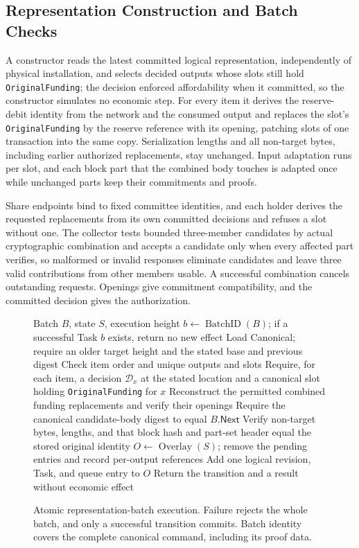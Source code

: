 \subsection{Representation Construction and Batch Checks}
A constructor reads the latest committed logical representation, independently of physical installation, and selects decided outputs whose slots still hold \texttt{OriginalFunding}; the decision enforced affordability when it committed, so the constructor simulates no economic step. For every item it derives the reserve-debit identity from the network and the consumed output and replaces the slot's \texttt{OriginalFunding} by the reserve reference with its opening, patching slots of one transaction into the same copy. Serialization lengths and all non-target bytes, including earlier authorized replacements, stay unchanged. Input adaptation runs per slot, and each block part that the combined body touches is adapted once while unchanged parts keep their commitments and proofs.

Share endpoints bind to fixed committee identities, and each holder derives the requested replacements from its own committed decisions and refuses a slot without one. The collector tests bounded three-member candidates by actual cryptographic combination and accepts a candidate only when every affected part verifies, so malformed or invalid responses eliminate candidates and leave three valid contributions from other members usable. A successful combination cancels outstanding requests. Openings give commitment compatibility, and the committed decision gives the authorization.

\begin{figure}[t]
  \small
  \begin{algorithmic}[1]
    \REQUIRE Batch $B$, state $S$, execution height
    \STATE $b\gets\operatorname{BatchID}(B)$; if a successful Task $b$
    exists, return no new effect
    \STATE Load Canonical; require an older target height and the stated
    base and previous digest
    \STATE Check item order and unique outputs and slots
    \STATE Require, for each item, a decision $\mathcal D_x$ at the
    stated location and a canonical slot holding \texttt{OriginalFunding}
    for $x$
    \STATE Reconstruct the permitted combined funding replacements and
    verify their openings
    \STATE Require the canonical candidate-body digest to equal
    $B.\mathsf{Next}$
    \STATE Verify non-target bytes, lengths, and that block hash and
    part-set header equal the stored original identity
    \STATE $O\gets\operatorname{Overlay}(S)$; remove the pending entries
    and record per-output references
    \STATE Add one logical revision, Task, and queue entry to $O$
    \STATE Return the transition and a result without economic effect
  \end{algorithmic}
  \caption{Atomic representation-batch execution. Failure rejects the
    whole batch, and only a successful transition commits. Batch
    identity covers the complete canonical command, including its proof
    data.}
  \label{fig:supp-protocol-batch}
\end{figure}


